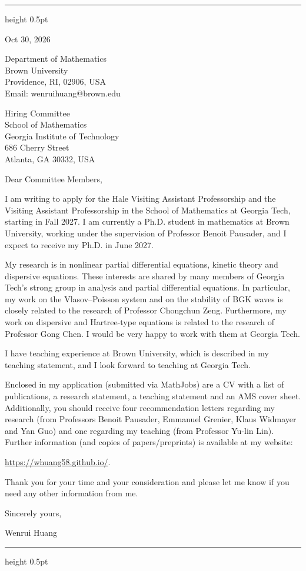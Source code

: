 \documentclass[10pt]{article}
\begin{document}
\vspace{0.08in}
\hrule height 0.5pt

\vspace{0.47in}
\hfill
\begin{minipage}{2.27in}
Oct 30, 2026

\vspace{0.16in}
Department of Mathematics\\
Brown University\\
Providence, RI, 02906, USA\\
Email: wenrui\textunderscore huang@brown.edu
\end{minipage}

\vspace{0.30in}
Hiring Committee\\
School of Mathematics\\
Georgia Institute of Technology\\
686 Cherry Street\\
Atlanta, GA 30332, USA
 
\vspace{0.16in}
Dear Committee Members,
 
I am writing to apply for the Hale Visiting Assistant Professorship and the Visiting Assistant Professorship in the School of Mathematics at Georgia Tech, starting in Fall 2027. I am currently a Ph.D. student in mathematics at Brown University, working under the supervision of Professor Benoit Pausader, and I expect to receive my Ph.D. in June 2027.
 
My research is in nonlinear partial differential equations, kinetic theory and dispersive equations. These interests are shared by many members of Georgia Tech's strong group in analysis and partial differential equations. In particular, my work on the Vlasov--Poisson system and on the stability of BGK waves is closely related to the research of Professor Chongchun Zeng. Furthermore, my work on dispersive and Hartree-type equations is related to the research of Professor Gong Chen. I would be very happy to work with them at Georgia Tech.
 
I have teaching experience at Brown University, which is described in my teaching statement, and I look forward to teaching at Georgia Tech.
 
Enclosed in my application (submitted via MathJobs) are a CV with a list of publications, a research statement, a teaching statement and an AMS cover sheet. Additionally, you should receive four recommendation letters regarding my research (from Professors Benoit Pausader, Emmanuel Grenier, Klaus Widmayer and Yan Guo) and one regarding my teaching (from Professor Yu-lin Lin). Further information (and copies of papers/preprints) is available at my website:

\url{https://whuang58.github.io/}.
 
 \medskip
Thank you for your time and your consideration and please let me know if you
need any other information from me.
 
\vspace{0.12in}
Sincerely yours,
 

Wenrui Huang
 
\vfill
\hrule height 0.5pt
 
\end{document}
